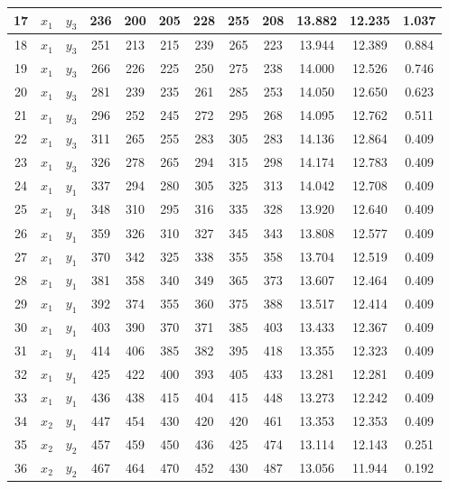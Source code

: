 \begin{longtable}[H]{c|c|c|c|c|c|c|c|c|c|c|c|}
    17 & $x_1$ & $y_3$ & 236 & 200 & 205 & 228 & 255 & 208 & 13.882 & 12.235 & 1.037 \\ \hline
    18 & $x_1$ & $y_3$ & 251 & 213 & 215 & 239 & 265 & 223 & 13.944 & 12.389 & 0.884 \\ \hline
    19 & $x_1$ & $y_3$ & 266 & 226 & 225 & 250 & 275 & 238 & 14.000 & 12.526 & 0.746 \\ \hline
    20 & $x_1$ & $y_3$ & 281 & 239 & 235 & 261 & 285 & 253 & 14.050 & 12.650 & 0.623 \\ \hline
    21 & $x_1$ & $y_3$ & 296 & 252 & 245 & 272 & 295 & 268 & 14.095 & 12.762 & 0.511 \\ \hline
    22 & $x_1$ & $y_3$ & 311 & 265 & 255 & 283 & 305 & 283 & 14.136 & 12.864 & 0.409 \\ \hline
    23 & $x_1$ & $y_3$ & 326 & 278 & 265 & 294 & 315 & 298 & 14.174 & 12.783 & 0.409 \\ \hline
    24 & $x_1$ & $y_1$ & 337 & 294 & 280 & 305 & 325 & 313 & 14.042 & 12.708 & 0.409 \\ \hline
    25 & $x_1$ & $y_1$ & 348 & 310 & 295 & 316 & 335 & 328 & 13.920 & 12.640 & 0.409 \\ \hline
    26 & $x_1$ & $y_1$ & 359 & 326 & 310 & 327 & 345 & 343 & 13.808 & 12.577 & 0.409 \\ \hline
    27 & $x_1$ & $y_1$ & 370 & 342 & 325 & 338 & 355 & 358 & 13.704 & 12.519 & 0.409 \\ \hline
    28 & $x_1$ & $y_1$ & 381 & 358 & 340 & 349 & 365 & 373 & 13.607 & 12.464 & 0.409 \\ \hline
    29 & $x_1$ & $y_1$ & 392 & 374 & 355 & 360 & 375 & 388 & 13.517 & 12.414 & 0.409 \\ \hline
    30 & $x_1$ & $y_1$ & 403 & 390 & 370 & 371 & 385 & 403 & 13.433 & 12.367 & 0.409 \\ \hline
    31 & $x_1$ & $y_1$ & 414 & 406 & 385 & 382 & 395 & 418 & 13.355 & 12.323 & 0.409 \\ \hline
    32 & $x_1$ & $y_1$ & 425 & 422 & 400 & 393 & 405 & 433 & 13.281 & 12.281 & 0.409 \\ \hline
    33 & $x_1$ & $y_1$ & 436 & 438 & 415 & 404 & 415 & 448 & 13.273 & 12.242 & 0.409 \\ \hline
    34 & $x_2$ & $y_1$ & 447 & 454 & 430 & 420 & 420 & 461 & 13.353 & 12.353 & 0.409 \\ \hline
    35 & $x_2$ & $y_2$ & 457 & 459 & 450 & 436 & 425 & 474 & 13.114 & 12.143 & 0.251 \\ \hline
    36 & $x_2$ & $y_2$ & 467 & 464 & 470 & 452 & 430 & 487 & 13.056 & 11.944 & 0.192 \\ \hline

\end{longtable}
